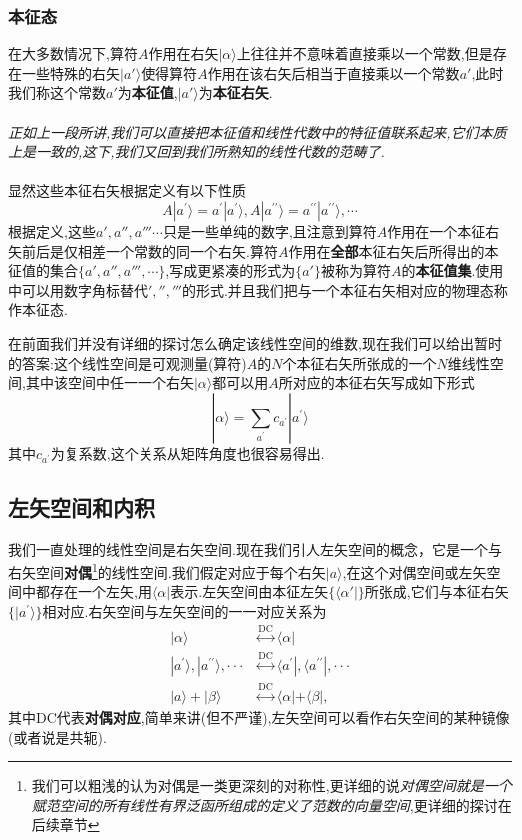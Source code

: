 \documentclass[lang=cn,newtx,10pt,scheme=chinese,thmcnt=section]{elegantbook}
\begin{document}
\subsubsection*{本征态}
在大多数情况下,算符$A$作用在右矢$|\alpha\rangle$上往往并不意味着直接乘以一个常数,但是存在一些特殊的右矢$|a'\rangle$使得算符$A$作用在该右矢后相当于直接乘以一个常数$a'$,此时我们称这个常数$a'$为\textbf{本征值},$|a'\rangle$为\textbf{本征右矢}.\\\\
\textit{正如上一段所讲,我们可以直接把本征值和线性代数中的特征值联系起来,它们本质上是一致的,这下,我们又回到我们所熟知的线性代数的范畴了.}\\\\
显然这些本征右矢根据定义有以下性质
\begin{equation}
	A| a^{\prime}\rangle=a^{\prime}| a^{\prime}\rangle,A| a^{\prime\prime}\rangle=a^{\prime\prime}| a^{\prime\prime}\rangle,\cdots
\end{equation}
根据定义,这些$a',a'',a'''\cdots$只是一些单纯的数字,且注意到算符$A$作用在一个本征右矢前后是仅相差一个常数的同一个右矢.算符$A$作用在\textbf{全部}本征右矢后所得出的本征值的集合$\{a',a'',a''',\cdots\}$,写成更紧凑的形式为$\{a'\}$被称为算符$A$的\textbf{本征值集}.使用中可以用数字角标替代$','','''$的形式.并且我们把与一个本征右矢相对应的物理态称作本征态.

在前面我们并没有详细的探讨怎么确定该线性空间的维数,现在我们可以给出暂时的答案:这个线性空间是可观测量(算符)$A$的$N$个本征右矢所张成的一个$N$维线性空间,其中该空间中任一一个右矢$|\alpha\rangle$都可以用$A$所对应的本征右矢写成如下形式
\begin{equation}
	|\alpha\rangle=\sum_{a^{\prime}}c_{a^{\prime}}| a^{\prime}\rangle 
\end{equation}
其中$c_{a^{\prime}}$为复系数,这个关系从矩阵角度也很容易得出.
\subsection*{左矢空间和内积}
我们一直处理的线性空间是右矢空间.现在我们引人左矢空间的概念，它是一个与右矢空间\textbf{对偶}\footnote{我们可以粗浅的认为对偶是一类更深刻的对称性,更详细的说\textit{对偶空间就是一个赋范空间的所有线性有界泛函所组成的定义了范数的向量空间},更详细的探讨在后续章节}的线性空间.我们假定对应于每个右矢$|a\rangle$,在这个对偶空间或左矢空间中都存在一个左矢,用$\langle\alpha|$表示.左矢空间由本征左矢$\{\langle\alpha'|\}$所张成,它们与本征右矢$\{|a^{\prime}\rangle\}$相对应.右矢空间与左矢空间的一一对应关系为
\begin{equation}
	\begin{aligned}|\alpha\rangle&\overset{\mathrm{DC}}{\operatorname*{\longleftrightarrow}}\langle\alpha|\\| a^{\prime}\rangle,| a^{\prime\prime}\rangle,\cdotp\cdotp\cdotp&\overset{\mathrm{DC}}{\operatorname*{\longleftrightarrow}}\langle a^{\prime}|,\langle a^{\prime\prime}|,\cdotp\cdotp\cdotp\\| a\rangle+|\beta\rangle&\overset{\mathrm{DC}}{\operatorname*{\longleftrightarrow}}\langle\alpha|+\langle\beta|,\end{aligned}
\end{equation}
其中DC代表\textbf{对偶对应},简单来讲(但不严谨),左矢空间可以看作右矢空间的某种镜像(或者说是共轭).
\end{document}
